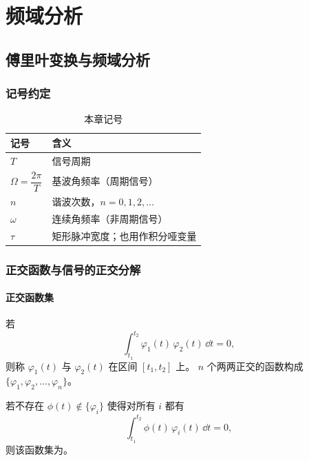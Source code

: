 \part{频域分析}

\chapter{傅里叶变换与频域分析}
\chaptertoc

\section{记号约定}

\begin{table}[htbp]
\centering
\caption{本章记号}
\begin{tabular}{@{}ll@{}}
\toprule
记号 & 含义 \\
\midrule
$T$ & 信号周期 \\
$\Omega=\dfrac{2\pi}{T}$ & 基波角频率（周期信号） \\
$n$ & 谐波次数，$n=0,1,2,\dots$ \\
$\omega$ & 连续角频率（非周期信号） \\
$\tau$ & 矩形脉冲宽度；也用作积分哑变量 \\
\bottomrule
\end{tabular}
\end{table}

\section{正交函数与信号的正交分解}

\subsection{正交函数集}

\begin{definition*}
若
\[
    \int_{t_1}^{t_2}\varphi_1(t)\,\varphi_2(t)\,\dd t=0,
\]
则称 $\varphi_1(t)$ 与 $\varphi_2(t)$ 在区间 $[t_1,t_2]$ 上。
$n$ 个两两正交的函数构成 $\{\varphi_1,\varphi_2,\dots,\varphi_n\}$。
\end{definition*}

\quad 若不存在 $\phi(t)\notin\{\varphi_i\}$ 使得对所有 $i$ 都有
\[
    \int_{t_1}^{t_2}\phi(t)\,\varphi_i(t)\,\dd t=0,
\]
则该函数集为。

